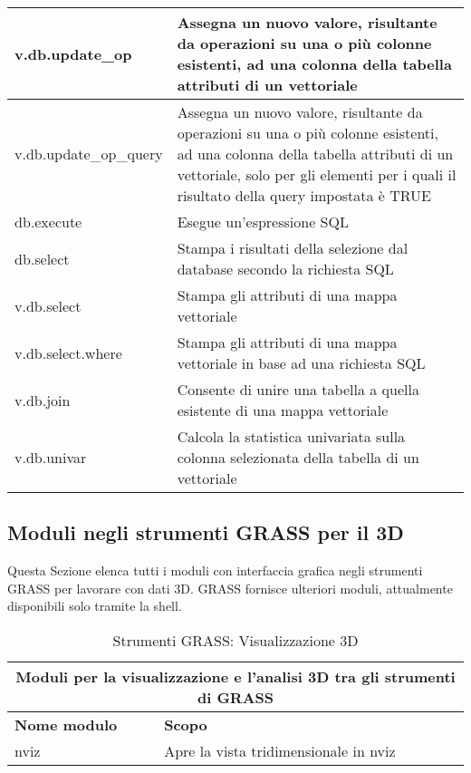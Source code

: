 \begin{table}[ht]
\begin{tabular}{|p{4cm}|p{12cm}|}
  \hline v.db.update\_op & Assegna un nuovo valore, risultante da operazioni su una o più colonne esistenti, ad una colonna della tabella attributi di un vettoriale \\
  \hline v.db.update\_op\_query & Assegna un nuovo valore, risultante da operazioni su una o più colonne esistenti, ad una colonna della tabella attributi di un vettoriale, solo per gli elementi per i quali il risultato della query impostata è TRUE \\
  \hline db.execute & Esegue un'espressione SQL \\
  \hline db.select & Stampa i risultati della selezione dal database secondo la richiesta SQL \\
  \hline v.db.select & Stampa gli attributi di una mappa vettoriale \\
  \hline v.db.select.where & Stampa gli attributi di una mappa vettoriale in base ad una richiesta SQL \\
  \hline v.db.join & Consente di unire una tabella a quella esistente di una mappa vettoriale \\
  \hline v.db.univar & Calcola la statistica univariata sulla colonna selezionata della tabella di un vettoriale \\
\hline
\end{tabular}
\end{table}

\clearpage

\subsection{Moduli negli strumenti GRASS per il 3D}

Questa Sezione elenca tutti i moduli con interfaccia grafica negli strumenti GRASS per lavorare con dati 3D. GRASS fornisce ulteriori moduli, attualmente disponibili solo tramite la shell.

\begin{table}[ht]
\centering
\caption{Strumenti GRASS: Visualizzazione 3D}\medskip
 \begin{tabular}{|p{4cm}|p{12cm}|}
  \hline \multicolumn{2}{|c|}{\textbf{Moduli per la visualizzazione e l'analisi 3D tra gli strumenti di GRASS}} \\
  \hline \textbf{Nome modulo} & \textbf{Scopo} \\
  \hline nviz & Apre la vista tridimensionale in nviz\\
\hline
\end{tabular}
\end{table}

